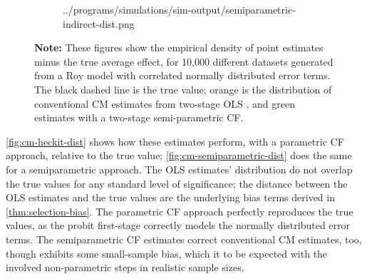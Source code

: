 \begin{figure}[h!]
\begin{subfigure}[c]{0.475\textwidth}
{            ../programs/simulations/sim-output/semiparametric-indirect-dist.png}
    \end{subfigure}
    \label{fig:cm-semiparametric-dist}
    \justify
    \footnotesize    
    \textbf{Note:}
    These figures show the empirical density of point estimates minus the true average effect, for 10,000 different datasets generated from a Roy model with correlated normally distributed error terms.
    The black dashed line is the true value;
    orange is the distribution of conventional CM estimates from two-stage OLS \citep{imai2010identification},
    and green estimates with a two-stage semi-parametric CF.
\end{figure}

\autoref{fig:cm-heckit-dist} shows how these estimates perform, with a parametric CF approach, relative to the true value; \autoref{fig:cm-semiparametric-dist} does the same for a semiparametric approach.
The OLS estimates' distribution do not overlap the true values for any standard level of significance; the distance between the OLS estimates and the true values are the underlying bias terms derived in \autoref{thm:selection-bias}.
The parametric CF approach perfectly reproduces the true values, as the probit first-stage correctly models the normally distributed error terms.
The semiparametric CF estimates correct conventional CM estimates, too, though exhibits some small-sample bias, which it to be expected with the involved non-parametric steps in realistic sample sizes.

